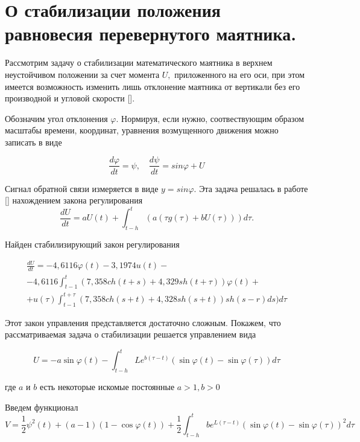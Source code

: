 \section{О стабилизации положения равновесия перевернутого маятника.} \label{p14}

Рассмотрим задачу о стабилизации математического маятника в верхнем неустойчивом положении за счет момента $U,$ приложенного на его оси, при этом имеется возможность изменить лишь отклонение маятника от вертикали без его производной и угловой скорости [].

Обозначим угол отклонения $\varphi.$ Нормируя, если нужно, соотвествующим образом масштабы времени, координат, уравнения возмущенного движения можно записать в виде

\begin{equation} \label{1.45'}
\frac{d \varphi}{dt} = \psi, \quad \frac{d \psi}{dt} = sin \varphi + U
\end{equation}

Сигнал обратной связи измеряется в виде $y = sin \varphi$. Эта задача решалась в работе [] нахождением закона регулирования $$\frac{d U}{d t} = a U(t) + \int_{t - h}^{t} (a (\tau g (\tau) + b U (\tau))) d \tau.$$

Найден стабилизирующий закон регулирования

\begin{equation} \label{1.46'}
\begin{array}{c}
\displaystyle \frac{d U}{d t} = - 4,6116 \varphi (t) - 3,1974 u(t) -\\
\displaystyle - 4,6116 \int_{t - 1}^{t} (7,358 ch(t + s) + 4,329 sh(t + \tau)) \varphi (t) +\\
\displaystyle + u(\tau) \int_{t - 1}^{t + \tau} (7,358 ch(s + t) + 4,328 sh(s + t)) sh(s - r) ds) d \tau
\end{array}
\end{equation}

Этот закон управления представляется достаточно сложным. Покажем, что рассматриваемая задача о стабилизации решается управлением вида 

\begin{equation} \label{1.47'}
U = - a \sin \varphi (t) - \int_{t-h}^{t} L e^{ b (\tau - t)} (\sin \varphi (t) - \sin \varphi (\tau)) d \tau
\end{equation}

где $a$ и $b$ есть некоторые искомые постоянные $a > 1, b > 0$

Введем функционал $$V = \frac12 \psi ^ 2 (t) + (a - 1) (1 - \cos \varphi (t)) + \frac12 \int_{t-h}^{t} b e^{L (\tau - t)} (\sin \varphi(t) - \sin \varphi (\tau))^2 d \tau$$

